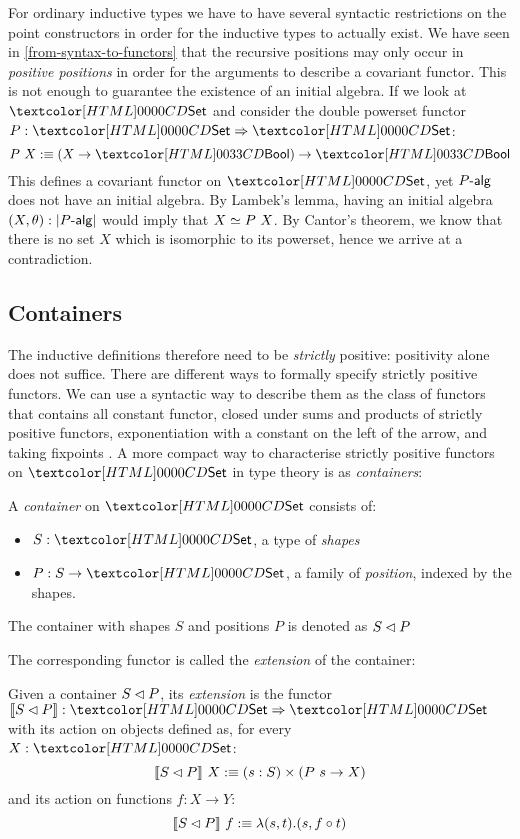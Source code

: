 For ordinary inductive types we have to have several syntactic
restrictions on the point constructors in order for the inductive
types to actually exist. We have seen in
\cref{from-syntax-to-functors} that the recursive positions may only
occur in \emph{positive positions} in order for the arguments to
describe a covariant functor. This is not enough to guarantee the
existence of an initial algebra. If we look at $\Set$ and consider the
double powerset functor $P : \Func{\Set}{\Set}$:
$$
P\ X \ddefeq (X \to \boolty) \to \boolty
$$
This defines a covariant functor on $\Set$, yet $\algcat{P}$ does not
have an initial algebra. By Lambek's lemma, having an initial algebra
$(X,\theta) : | \algcat{P} |$ would imply that $X \simeq P\ X$. By
Cantor's theorem, we know that there is no set $X$ which is isomorphic
to its powerset, hence we arrive at a contradiction.

\subsection{Containers}
The inductive definitions therefore need to be \emph{strictly}
positive: positivity alone does not suffice. There are different ways
to formally specify strictly positive functors. We can use a syntactic
way to describe them as the class of functors that contains all
constant functor, closed under sums and products of strictly positive
functors, exponentiation with a constant on the left of the arrow, and
taking fixpoints \cite{Morris2007}. A more compact way to characterise
strictly positive functors on $\Set$ in type theory is as
\emph{containers}:
%
\begin{definition}
\label{def-container}
  A \emph{container} on $\Set$ consists of:
  \begin{itemize}
  \item $S : \Set$, a type of \emph{shapes}
  \item $P : S \to \Set$, a family of \emph{position}, indexed by the shapes.
  \end{itemize}
  The container with shapes $S$ and positions $P$ is denoted as
  $S \lhd P$
\end{definition}
%
The corresponding functor is called the \emph{extension} of the container:
%
\begin{definition}
  Given a container $S \lhd P$, its \emph{extension} is the functor
  $\context{\cont{S}{P}} : \Func{\Set}{\Set}$ with its action on objects
  defined as, for every $X : \Set$:
  $$
  \llbracket S \lhd P \rrbracket\ X :\equiv (s : S) \times (P\ s \to X)
  $$
  and its action on functions $f : X \to Y$:
  $$
  \llbracket S \lhd P \rrbracket\ f :\equiv \lambda (s , t) . (s , f \circ t)
  $$
\end{definition}

